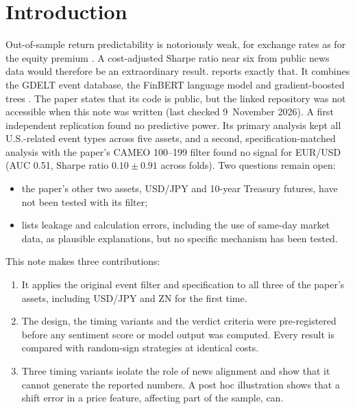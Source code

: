 \documentclass[11pt]{article}
\begin{document}
\section{Introduction}
Out-of-sample return predictability is notoriously weak, for exchange rates \citep{meese1983} as for the equity
premium \citep{goyal2024}. A cost-adjusted Sharpe ratio near six from public news data would therefore be an
extraordinary result. \citet{zhang2025} reports exactly that. It combines the GDELT event database, the FinBERT
language model \citep{araci2019} and gradient-boosted trees \citep{chen2016}. The paper states that its code is
public, but the linked repository was not accessible when this note was written (last checked 9~November 2026). A first
independent replication \citep{andrews2026} found no predictive power. Its primary analysis kept all U.S.-related event
types across five assets, and a second, specification-matched analysis with the paper's CAMEO 100--199 filter found no
signal for EUR/USD (AUC 0.51, Sharpe ratio $0.10\pm0.91$ across folds). Two questions remain open:
\begin{itemize}
  \item the paper's other two assets, USD/JPY and 10-year Treasury futures, have not been tested with its filter;
  \item \citet{andrews2026} lists leakage and calculation errors, including the use of same-day market data, as
        plausible explanations, but no specific mechanism has been tested.
\end{itemize}

This note makes three contributions:
\begin{enumerate}
  \item It applies the original event filter and specification to all three of the paper's assets, including
        USD/JPY and ZN for the first time.
  \item The design, the timing variants and the verdict criteria were pre-registered before any sentiment score or
        model output was computed. Every result is compared with random-sign strategies at identical costs.
  \item Three timing variants isolate the role of news alignment and show that it cannot generate the reported
        numbers. A post hoc illustration shows that a shift error in a price feature, affecting part of the sample, can.
\end{enumerate}
\end{document}
